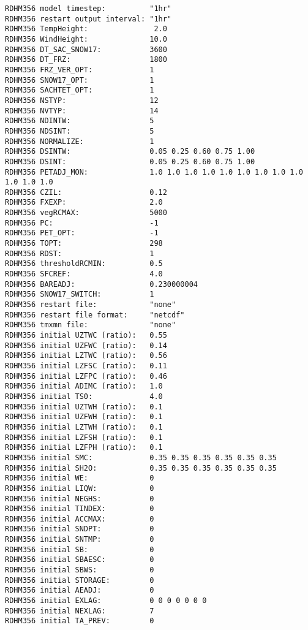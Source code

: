 \begin{Verbatim}[frame=single]
RDHM356 model timestep:          "1hr"
RDHM356 restart output interval: "1hr"
RDHM356 TempHeight:               2.0
RDHM356 WindHeight:              10.0
RDHM356 DT_SAC_SNOW17:           3600
RDHM356 DT_FRZ:                  1800
RDHM356 FRZ_VER_OPT:             1
RDHM356 SNOW17_OPT:              1
RDHM356 SACHTET_OPT:             1
RDHM356 NSTYP:                   12
RDHM356 NVTYP:                   14
RDHM356 NDINTW:                  5
RDHM356 NDSINT:                  5
RDHM356 NORMALIZE:               1
RDHM356 DSINTW:                  0.05 0.25 0.60 0.75 1.00
RDHM356 DSINT:                   0.05 0.25 0.60 0.75 1.00
RDHM356 PETADJ_MON:              1.0 1.0 1.0 1.0 1.0 1.0 1.0 1.0 1.0 1.0 1.0 1.0
RDHM356 CZIL:                    0.12
RDHM356 FXEXP:                   2.0
RDHM356 vegRCMAX:                5000
RDHM356 PC:                      -1
RDHM356 PET_OPT:                 -1
RDHM356 TOPT:                    298
RDHM356 RDST:                    1
RDHM356 thresholdRCMIN:          0.5
RDHM356 SFCREF:                  4.0
RDHM356 BAREADJ:                 0.230000004
RDHM356 SNOW17_SWITCH:           1
RDHM356 restart file:            "none"
RDHM356 restart file format:     "netcdf"
RDHM356 tmxmn file:              "none"
RDHM356 initial UZTWC (ratio):   0.55
RDHM356 initial UZFWC (ratio):   0.14
RDHM356 initial LZTWC (ratio):   0.56
RDHM356 initial LZFSC (ratio):   0.11
RDHM356 initial LZFPC (ratio):   0.46
RDHM356 initial ADIMC (ratio):   1.0
RDHM356 initial TS0:             4.0
RDHM356 initial UZTWH (ratio):   0.1
RDHM356 initial UZFWH (ratio):   0.1
RDHM356 initial LZTWH (ratio):   0.1
RDHM356 initial LZFSH (ratio):   0.1
RDHM356 initial LZFPH (ratio):   0.1
RDHM356 initial SMC:             0.35 0.35 0.35 0.35 0.35 0.35
RDHM356 initial SH2O:            0.35 0.35 0.35 0.35 0.35 0.35
RDHM356 initial WE:              0
RDHM356 initial LIQW:            0
RDHM356 initial NEGHS:           0
RDHM356 initial TINDEX:          0
RDHM356 initial ACCMAX:          0
RDHM356 initial SNDPT:           0
RDHM356 initial SNTMP:           0
RDHM356 initial SB:              0
RDHM356 initial SBAESC:          0
RDHM356 initial SBWS:            0
RDHM356 initial STORAGE:         0
RDHM356 initial AEADJ:           0
RDHM356 initial EXLAG:           0 0 0 0 0 0 0
RDHM356 initial NEXLAG:          7
RDHM356 initial TA_PREV:         0
 \end{Verbatim}




